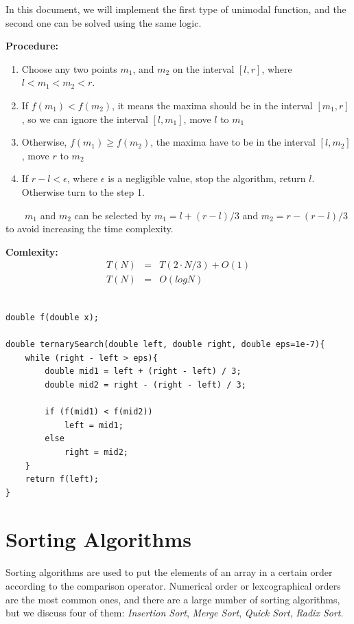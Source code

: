 \documentclass[12pt]{article}
\begin{document}
In this document, we will implement the first type of unimodal function, and the second one can be solved using the same logic.

\textbf{Procedure: }
\begin{enumerate}
	\item Choose any two points $m_1$, and $m_2$ on the interval $[l, r]$, where $l < m_1 < m_2 < r$.
	\item If $f(m_1) < f(m_2)$, it means the maxima should be in the interval $[m_1, r]$, so we can ignore the interval $[l, m_1]$, move $l$ to $m_1$
	\item Otherwise, $f(m_1) \geq f(m_2)$, the maxima have to be in the interval $[l, m_2]$, move $r$ to $m_2$
	\item If $r - l < \epsilon$, where $\epsilon$ is a negligible value, stop the algorithm, return $l$. Otherwise turn to the step 1. 
\end{enumerate}	

\ \ \ \  $m_1$ and $m_2$ can be selected by $m_1 = l + (r - l) / 3$ and $m_2 = r - (r - l) / 3$ to avoid increasing the time complexity.

\textbf{Comlexity: }
\begin{eqnarray*}
	T(N) &=& T(2 \cdot N / 3) + O(1) \\
	T(N) &=& O(logN)
\end{eqnarray*}



\begin{verbatim}

double f(double x);

double ternarySearch(double left, double right, double eps=1e-7){
    while (right - left > eps){
        double mid1 = left + (right - left) / 3;
        double mid2 = right - (right - left) / 3;
        
        if (f(mid1) < f(mid2))
            left = mid1;
        else
            right = mid2;
    }
    return f(left);
}
\end{verbatim}

\cleardoublepage

	\section{Sorting Algorithms}

	
	Sorting algorithms are used to put the elements of an array in a certain order according to the comparison operator. Numerical order or lexcographical orders are the most common ones, and there are a large number of sorting algorithms, but we discuss four of them: \textit{Insertion Sort}, \textit{Merge Sort}, \textit{Quick Sort}, \textit{Radix Sort}. 
	
\end{document}
